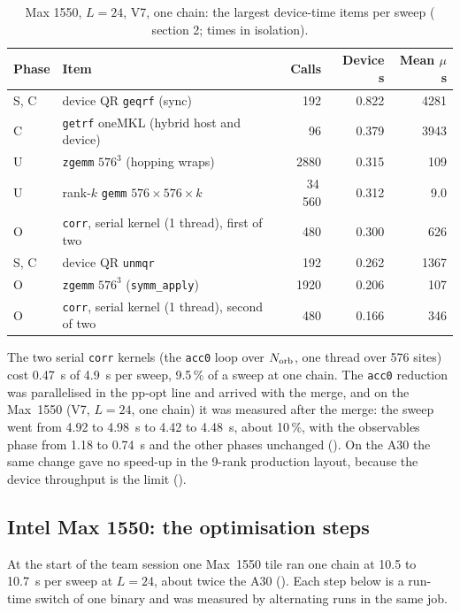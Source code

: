 \begin{table}[h]
\centering
\caption{Max 1550, $L=24$, V7, one chain: the largest device-time items per sweep ( section 2; times in isolation).}
\label{tab:p7top}
\small
\begin{tabular}{@{}llrrr@{}}
\toprule
Phase & Item & Calls & Device s & Mean $\mu$s \\
\midrule
S, C & device QR \texttt{geqrf} (sync) & 192 & 0.822 & 4281 \\ %
C & \texttt{getrf} oneMKL (hybrid host and device) & 96 & 0.379 & 3943 \\
U & \texttt{zgemm} $576^3$ (hopping wraps) & 2880 & 0.315 & 109 \\
U & rank-$k$ \texttt{gemm} $576\times576\times k$ & 34\,560 & 0.312 & 9.0 \\
O & \texttt{corr}, serial kernel (1 thread), first of two & 480 & 0.300 & 626 \\
S, C & device QR \texttt{unmqr} & 192 & 0.262 & 1367 \\
O & \texttt{zgemm} $576^3$ (\texttt{symm\_apply}) & 1920 & 0.206 & 107 \\
O & \texttt{corr}, serial kernel (1 thread), second of two & 480 & 0.166 & 346 \\
\bottomrule
\end{tabular}
\end{table}

The two serial \texttt{corr} kernels (the \texttt{acc0} loop over $N_{\rm orb}$, one thread over 576 sites) cost 0.47~s of 4.9~s per sweep, 9.5\,\% of a sweep at one chain. The \texttt{acc0} reduction was parallelised in the pp-opt line and arrived with the merge, and on the Max~1550 (V7, $L=24$, one chain) it was measured after the merge: the sweep went from 4.92 to 4.98~s to 4.42 to 4.48~s, about 10\,\%, with the observables phase from 1.18 to 0.74~s and the other phases unchanged (). On the A30 the same change gave no speed-up in the 9-rank production layout, because the device throughput is the limit ().

\subsection{Intel Max 1550: the optimisation steps}
\label{sec:intel}

At the start of the team session one Max~1550 tile ran one chain at 10.5 to 10.7~s per sweep at $L=24$, about twice the A30 (). Each step below is a run-time switch of one binary and was measured by alternating runs in the same job.

